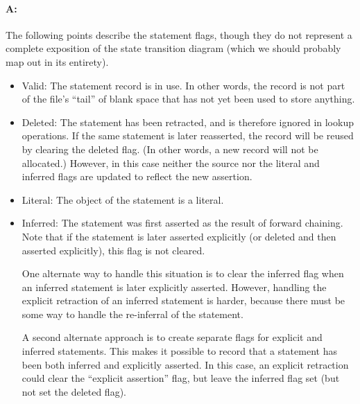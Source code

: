\documentclass[12pt,letterpaper,draft]{article}
\begin{document}
\paragraph{A:}The following points describe the statement flags, though they do not represent a complete exposition of the state transition diagram (which we should probably map out in its entirety).
\begin{itemize}
	\item Valid:  The statement record is in use.  In other words, the record is not part of the file's ``tail'' of blank space that has not yet been used to store anything.

	\item Deleted:  The statement has been retracted, and is therefore ignored in lookup operations.  If the same statement is later reasserted, the record will be reused by clearing the deleted flag.  (In other words, a new record will not be allocated.)  However, in this case neither the source nor the literal and inferred flags are updated to reflect the new assertion.

	\item Literal:  The object of the statement is a literal.

	\item Inferred:  The statement was first asserted as the result of forward chaining.  Note that if the statement is later asserted explicitly (or deleted and then asserted explicitly), this flag is not cleared.

	One alternate way to handle this situation is to clear the inferred flag when an inferred statement is later explicitly asserted.  However, handling the explicit retraction of an inferred statement is harder, because there must be some way to handle the re-inferral of the statement.

	A second alternate approach is to create separate flags for explicit and inferred statements.  This makes it possible to record that a statement has been both inferred and explicitly asserted.  In this case, an explicit retraction could clear the ``explicit assertion'' flag, but leave the inferred flag set (but not set the deleted flag).
\end{itemize}
\end{document}
